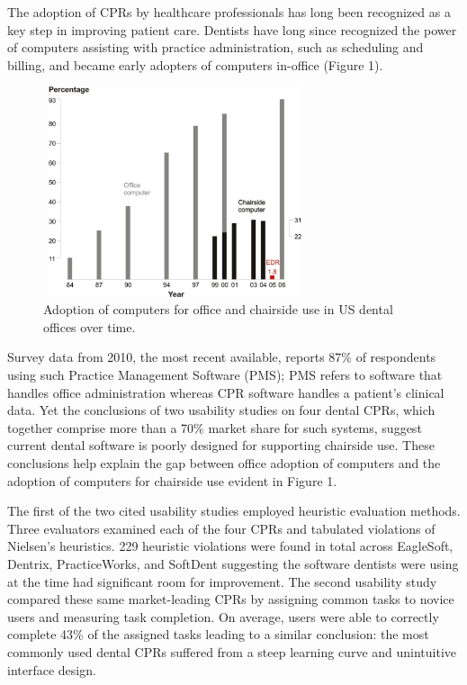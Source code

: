 \documentclass[11pt]{article}
\begin{document}
The adoption of CPRs by healthcare professionals has long been recognized as a key step in improving patient care.\cite{Chasteen1992A-computer-data,Eisne1993The-computer-ba,Thompson2004The-Decade-of-H,Spicer2008Bytes-and-bites,Schleyer2011Advancing-oral} Dentists have long since recognized the power of computers assisting with practice administration, such as scheduling and billing, and became early adopters of computers in-office (Figure 1).
\label{fig:1}
\begin{figure}[!b]
\begin{center}
\includegraphics[width=220pt, height=175pt]{comp.png}
\end{center}
\caption{Adoption of computers for office and chairside use in US dental offices over time.\cite{Schleyer2006Clinical-Comput}}
\end{figure}Survey data from 2010, the most recent available, reports 87\% of respondents using such Practice Management Software (PMS); PMS refers to software that handles office administration whereas CPR software handles a patient's clinical data.\cite{Levine2010} Yet the conclusions of two usability studies on four dental CPRs, which together comprise more than a 70\% market share for such systems, suggest current dental software is poorly designed for supporting chairside use.\cite{Thyvalikakath2007Heuristic-evalu,Thyvalikakath2008A-usability-eva} These conclusions help explain the gap between office adoption of computers and the adoption of computers for chairside use evident in Figure 1.

The first of the two cited usability studies employed heuristic evaluation\cite{Nielsen1994Usability-Inspe} methods. Three evaluators examined each of the four CPRs and tabulated violations of Nielsen's heuristics. 229 heuristic violations were found in total across EagleSoft, Dentrix, PracticeWorks, and SoftDent suggesting the software dentists were using at the time had significant room for improvement. The second usability study compared\cite{Nielsen1994Enhancing-the-e} these same market-leading CPRs by assigning common tasks to novice users and measuring task completion. On average, users were able to correctly complete 43\% of the assigned tasks leading to a similar conclusion: the most commonly used dental CPRs suffered from a steep learning curve and unintuitive interface design.
\end{document}

